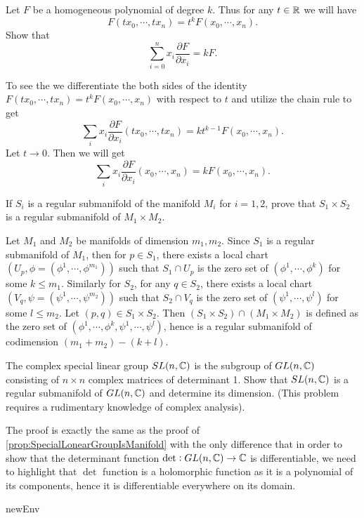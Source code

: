 \begin{problem}
	Let $ F $ be a homogeneous polynomial of degree $ k $. Thus for any $ t\in \mathbb{R} $ we will have
	\[ F(tx_0,\cdots, tx_n) = t^k F(x_0,\cdots,x_n). \]
	Show that 
	\[ \sum_{i=0}^{n} x_i \frac{\partial F}{\partial x_i} = kF. \]
\end{problem}
\begin{solution}
	To see the we differentiate the both sides of the identity $  F(tx_0,\cdots, tx_n) = t^k F(x_0,\cdots,x_n) $ with respect to $ t $ and utilize the chain rule to get
	\[ \sum_i x_i \frac{\partial F}{\partial x_i}(tx_0,\cdots,tx_n) = kt^{k-1}F(x_0,\cdots,x_n). \]
	Let $ t\to 0 $. Then we will get
	\[ \sum_i x_i \frac{\partial F}{\partial x_i}(x_0,\cdots,x_n) = k F(x_0,\cdots,x_n). \]
\end{solution}

\begin{problem}
	If $ S_i $ is a regular submanifold of the manifold $ M_i $ for $ i=1,2 $, prove that $ S_1\times S_2 $ is a regular submanifold of $ M_1\times M_2 $.
\end{problem}
\begin{solution}
	Let $ M_1 $ and $ M_2 $ be manifolds of dimension $ m_1, m_2 $. Since $ S_1 $ is a regular submanifold of $ M_1 $, then for $ p \in S_1 $, there exists a local chart $ (U_p, \phi = (\phi^1,\cdots,\phi^{m_1})) $ such that $ S_1\cap U_p $ is the zero set of $ (\phi^1,\cdots,\phi^k) $ for some $ k \leq m_1 $. Similarly for $ S_2 $, for any $ q \in S_2 $, there exists a local chart $ (V_q, \psi=(\psi^1,\cdots,\psi^{m_2})) $ such that $ S_2\cap V_q $ is the zero set of $ (\psi^1,\cdots,\psi^l) $ for some $ l \leq m_2 $. Let $ (p,q) \in S_1\times S_2 $. Then $ (S_1\times S_2)\cap (M_1\times M_2) $ is defined as the zero set of $ (\phi^1,\cdots,\phi^k,\psi^1,\cdots,\psi^l) $, hence is a regular submanifold of codimension $ (m_1+m_2) - (k+l) $.
\end{solution}
\begin{problem}
	The complex special linear group $ SL(n,\mathbb{C}) $ is the subgroup of $ GL(n,\mathbb{C}) $ consisting of $ n\times n$ complex matrices of determinant 1. Show that $ SL(n,\mathbb{C}) $ is a regular submanifold of $ GL(n,\mathbb{C}) $ and determine its dimension. (This problem requires a rudimentary knowledge of complex analysis).
\end{problem}
\begin{solution}
	The proof is exactly the same as the proof of \autoref{prop:SpecialLonearGroupIsManifold} with the only difference that in order to show that the determinant function $ \det: GL(n,\mathbb{C}) \to \mathbb{C} $ is differentiable, we need to highlight that $ \det $ function is a holomorphic function as it is a polynomial of its components, hence it is differentiable everywhere on its domain.
\end{solution}
\begin{problem}
	newEnv
\end{problem}


